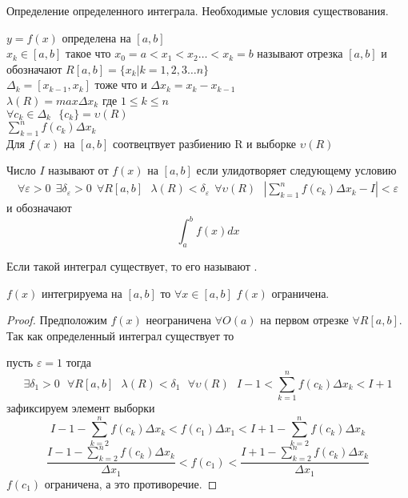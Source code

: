 \begin{title}
  Определение определенного интеграла. Необходимые условия существования.
\end{title}

$y = f(x)$ определена на $[a,b]$\\
$x_k \in [a,b]$ такое что $x_0 = a < x_1 < x_2 \ldots < x_k = b$ называют
 отрезка $[a,b]$ и обозначают $R [a,b] =
\{x_k | k = 1,2,3 \ldots n\}$\\
$\Delta_k = [x_{k-1}, x_k]$ тоже что и $\Delta{x_k} = x_k - x_{k-1}$\\
$\lambda(R) = max\Delta x_k$ где $1 \le k \le n$ \\
$\forall c_k \in \Delta_k ~~~ \{c_k\} = \upsilon(R)$ \\
$\sum_{k=1}^{n} f(c_k)\Delta x_k$ \\

Для $f(x)$ на $[a,b]$ соотвецтвует разбиению R и выборке $\upsilon(R)$\\

\begin{defin}
  Число $I$ называют  от $f(x)$ на $[a,b]$ если
  улидотворяет следующему условию
  \begin{eqnarray*}
    \forall\varepsilon>0 ~~ \exists\delta_{\varepsilon}>0 ~~ \forall R[a,b] ~~~
    \lambda(R)<\delta_{\varepsilon} ~~ \forall\upsilon(R) ~~~
    \left| \sum_{k=1}^{n} f(c_k)\Delta x_k - I \right| < \varepsilon
  \end{eqnarray*}
   и обозначают
  $$\int_{a}^{b} f(x)dx$$

  Если такой интеграл существует, то его называют .
\end{defin}

\begin{block}
  $f(x)$ интегрируема на $[a,b]$ то $\forall x \in [a,b]$ $f(x)$ ограничена.
\end{block}

\begin{proof}
  Предположим $f(x)$ неограничена $\forall O(a)$ на первом
  отрезке $\forall R[a,b]$. Так как определенный интеграл существует
  то

  пусть $\varepsilon = 1$ тогда
  \[
  \exists \delta_1 > 0 ~~~ \forall R[a,b] ~~~
  \lambda(R) < \delta_1 ~~~ \forall \upsilon(R) ~~~
   I-1 < \sum_{k=1}^{n} f(c_k)\Delta x_k < I+1
  \] зафиксируем элемент выборки
  $$
  I - 1 - \sum_{k=2}^n f(c_k) \Delta x_k < f(c_1) \Delta x_1 <
  I + 1 - \sum_{k=2}^n f(c_k) \Delta x_k
  $$
  $$
  \frac{I-1 - \sum_{k=2}^n f(c_k) \Delta x_k}{\Delta x_1} <
  f(c_1) < \frac{I+1 - \sum_{k=2}^n f(c_k) \Delta x_k}{\Delta x_1}
  $$
  $f(c_1)$ ограничена, а это противоречие.
\end{proof}

